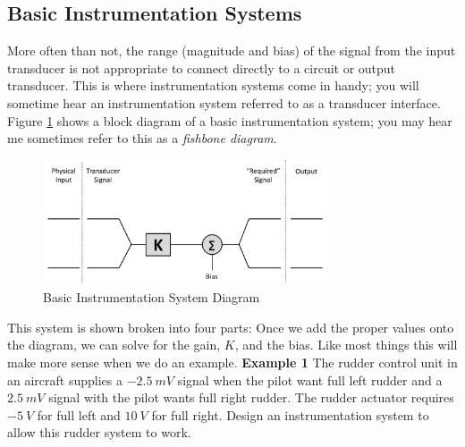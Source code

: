 \documentclass{handout}
\begin{document}
\subsection{Basic Instrumentation Systems}

More often than not, the range (magnitude and bias) of the signal from the input transducer is not appropriate to connect directly to a circuit or output transducer.  This is where instrumentation systems come in handy; you will sometime hear an instrumentation system referred to as a transducer interface.  Figure \ref{fig: InstrumentationSystem} shows a block diagram of a basic instrumentation system; you may hear me sometimes refer to this as a {\em fishbone diagram}.

\begin{figure} [h!]
\centering
\includegraphics[width=0.75\textwidth]{InstrumentationSystem.jpg}
\caption{Basic Instrumentation System Diagram}
\label{fig: InstrumentationSystem}
\end{figure}
This system is shown broken into four parts:
Once we add the proper values onto the diagram, we can solve for the gain, $K$, and the bias.  Like most things this will make more sense when we do an example.
\newpage
\clearpage
\pagebreak
\textbf{Example 1}
The rudder control unit in an aircraft supplies a $-2.5\ mV$ signal when the pilot want full left rudder and a $2.5\ mV$ signal with the pilot wants full right rudder.  The rudder actuator requires $-5\ V$ for full left and $10\ V$ for full right.  Design an instrumentation system to allow this rudder system to work.
\end{document}
